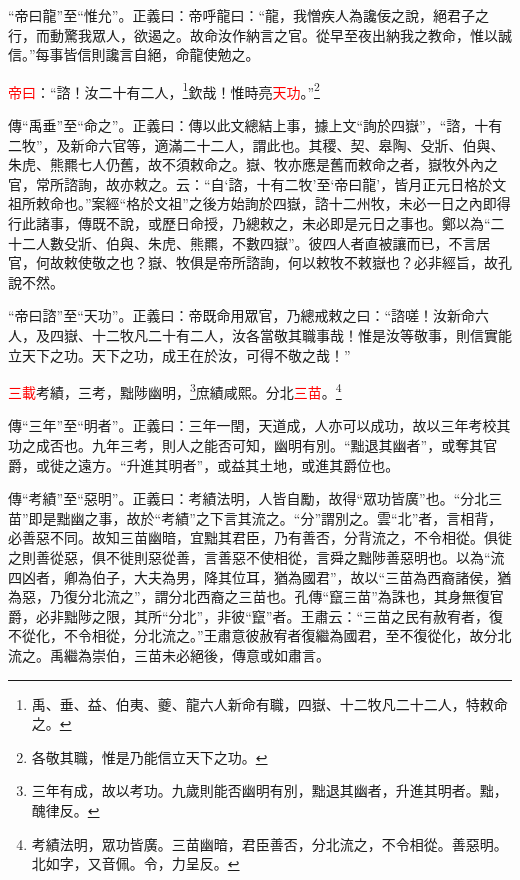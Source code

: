 {\noindent\shu{}\fzkt “帝曰龍”至“惟允”。正義曰：帝呼龍曰：“龍，我憎疾人為讒佞之說，絕君子之行，而動驚我眾人，欲遏之。故命汝作納言之官。從早至夜出納我之教命，惟以誠信。”每事皆信則讒言自絕，命龍使勉之。 \par}

\textcolor{red}{帝曰}：“諮！汝二十有二人，\footnote{禹、垂、益、伯夷、夔、龍六人新命有職，四嶽、十二牧凡二十二人，特敕命之。}欽哉！惟時亮\textcolor{red}{天功}。”\footnote{各敬其職，惟是乃能信立天下之功。}

{\noindent\zhuan{}\fzbyks 傳“禹垂”至“命之”。正義曰：傳以此文總結上事，據上文“詢於四嶽”，“諮，十有二牧”，及新命六官等，適滿二十二人，謂此也。其稷、契、皋陶、殳斨、伯與、朱虎、熊羆七人仍舊，故不須敕命之。嶽、牧亦應是舊而敕命之者，嶽牧外內之官，常所諮詢，故亦敕之。云：“自‘諮，十有二牧’至‘帝曰龍’，皆月正元日格於文祖所敕命也。”案經“格於文祖”之後方始詢於四嶽，諮十二州牧，未必一日之內即得行此諸事，傳既不說，或歷日命授，乃總敕之，未必即是元日之事也。鄭以為“二十二人數殳斨、伯與、朱虎、熊羆，不數四嶽”。彼四人者直被讓而已，不言居官，何故敕使敬之也？嶽、牧俱是帝所諮詢，何以敕牧不敕嶽也？必非經旨，故孔說不然。 \par}

{\noindent\shu{}\fzkt “帝曰諮”至“天功”。正義曰：帝既命用眾官，乃總戒敕之曰：“諮嗟！汝新命六人，及四嶽、十二牧凡二十有二人，汝各當敬其職事哉！惟是汝等敬事，則信實能立天下之功。天下之功，成王在於汝，可得不敬之哉！” \par}

\textcolor{red}{三載}考績，三考，黜陟幽明，\footnote{三年有成，故以考功。九歲則能否幽明有別，黜退其幽者，升進其明者。黜，醜律反。}庶績咸熙。分北\textcolor{red}{三苗}。\footnote{考績法明，眾功皆廣。三苗幽暗，君臣善否，分北流之，不令相從。善惡明。北如字，又音佩。令，力呈反。}

{\noindent\zhuan{}\fzbyks 傳“三年”至“明者”。正義曰：三年一閏，天道成，人亦可以成功，故以三年考校其功之成否也。九年三考，則人之能否可知，幽明有別。“黜退其幽者”，或奪其官爵，或徙之遠方。“升進其明者”，或益其土地，或進其爵位也。 \par}

{\noindent\zhuan{}\fzbyks 傳“考績”至“惡明”。正義曰：考績法明，人皆自勵，故得“眾功皆廣”也。“分北三苗”即是黜幽之事，故於“考績”之下言其流之。“分”謂別之。雲“北”者，言相背，必善惡不同。故知三苗幽暗，宜黜其君臣，乃有善否，分背流之，不令相從。俱徙之則善從惡，俱不徙則惡從善，言善惡不使相從，言舜之黜陟善惡明也。以為“流四凶者，卿為伯子，大夫為男，降其位耳，猶為國君”，故以“三苗為西裔諸侯，猶為惡，乃復分北流之”，謂分北西裔之三苗也。孔傳“竄三苗”為誅也，其身無復官爵，必非黜陟之限，其所“分北”，非彼“竄”者。王肅云：“三苗之民有赦宥者，復不從化，不令相從，分北流之。”王肅意彼赦宥者復繼為國君，至不復從化，故分北流之。禹繼為崇伯，三苗未必絕後，傳意或如肅言。 \par}

